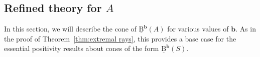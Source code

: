\documentclass[12pt]{amsart}
\theoremstyle{definition}
\theoremstyle{remark}
\newcommand{\VV}{\mathrm{V}}
\newcommand{\bb}{\mathbf{b}}
\newcommand{\BBQ}{\underline{\mathrm{B}}}
\begin{document}
%


\subsection{Refined theory for $A$}\label{sec:refined A}
In this section, we will describe the cone of $\BBQ^{\bb}(A)$ for various values of $\bb$.
As in the proof of Theorem~\ref{thm:extremal rays}, this provides a base case for the essential positivity results about cones of the form $\BBQ^{\bb}(S)$.
\end{document}
